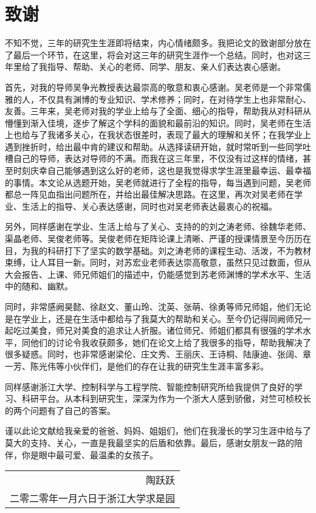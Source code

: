 \chapter{致\texorpdfstring{\ZJUspace}{}谢}
	不知不觉，三年的研究生生涯即将结束，内心情绪颇多。我把论文的致谢部分放在了最后一个环节，在这里，将会对这三年的研究生涯作一个总结。同时，也对这三年里给了我指导、帮助、关心的老师、同学、朋友、亲人们表达衷心感谢。
	
	首先，对我的导师吴争光教授表达最崇高的敬意和衷心感谢。吴老师是一个非常儒雅的人，不仅具有渊博的专业知识、学术修养；同时，在对待学生上也非常耐心、友善。三年来，吴老师对我的学业上给与了全面、细心的指导，帮助我从对科研从懵懂到渐入佳境，逐步了解这个学科的面貌和最前沿的知识。同时，吴老师在生活上也给与了我诸多关心，在我状态很差时，表现了最大的理解和关怀；在我学业上遇到挫折时，给出最中肯的建议和帮助。从选择读研开始，就时常听到一些同学吐槽自己的导师，表达对导师的不满。而我在这三年里，不仅没有过这样的情绪，甚至时刻庆幸自己能够遇到这么好的老师，这也是我觉得求学生涯里最幸运、最幸福的事情。本文论从选题开始，吴老师就进行了全程的指导，每当遇到问题，吴老师都总一阵见血指出问题所在，并给出最佳解决思路。在这里，再次对吴老师在学业、生活上的指导、关心表达感谢，同时也对吴老师表达最衷心的祝福。
	
	另外，同样感谢在学业、生活上给与了关心、支持的的刘之涛老师、徐魏华老师、渠晶老师、吴俊老师等。吴俊老师在矩阵论课上清晰、严谨的授课情景至今历历在目，为我的科研打下了坚实的数学基础。刘之涛老师的课程生动、活泼，不为教材束缚，让人耳目一新。同时，对苏宏业老师表达崇高敬意，虽然只见过数面，但从大会报告、上课、师兄师姐们的描述中，仍能感觉到苏老师渊博的学术水平、生活中的随和、幽默。
	
	同时，非常感阙昊懿、徐赵文、董山玲、沈英、张萌、徐勇等师兄师姐，他们无论是在学业上，还是在生活中都给与了我莫大的帮助和关心。至今仍记得同阙师兄一起吃过美食，师兄对美食的追求让人折服。诸位师兄、师姐们都具有很强的学术水平，同他们的讨论令我收获颇多，她们在论文上给了我很多的指导，帮助我解决了很多疑惑。同时，也非常感谢梁伦、庄文秀、王丽庆、王诗桐、陆康迪、张阔、章一芳、陈光伟等小伙伴们，是他们的存在让我的研究生生涯丰富多彩。
	
	同样感谢浙江大学、控制科学与工程学院、智能控制研究所给我提供了良好的学习、科研平台。从本科到研究生，深深为作为一个浙大人感到骄傲，对竺可桢校长的两个问题有了自己的答案。
	
	谨以此论文献给我亲爱的爸爸、妈妈、姐姐们，他们在我漫长的学习生涯中给与了莫大的支持、关心，一直是我最坚实的后盾和依靠。最后，感谢女朋友一路的陪伴，你是眼中最可爱、最温柔的女孩子。
	
\hfill
\begin{minipage}{17.4em}
\begin{center}
	\begin{tabular}{r}
		陶跃跃\\
		二零二零年一月六日于浙江大学求是园
	\end{tabular}
\end{center}
\end{minipage}
